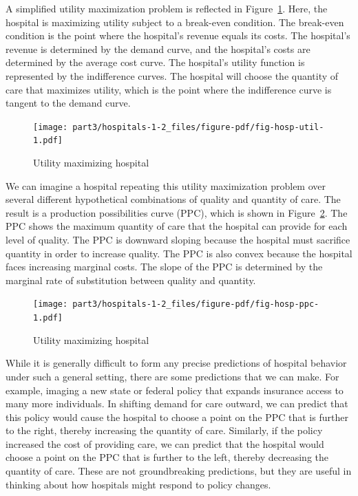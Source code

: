 \documentclass[
  letterpaper,
  DIV=11,
  numbers=noendperiod]{scrreport}
\theoremstyle{definition}
\theoremstyle{remark}
\begin{document}
A simplified utility maximization problem is reflected in
Figure~\ref{fig-hosp-util}. Here, the hospital is maximizing utility
subject to a break-even condition. The break-even condition is the point
where the hospital's revenue equals its costs. The hospital's revenue is
determined by the demand curve, and the hospital's costs are determined
by the average cost curve. The hospital's utility function is
represented by the indifference curves. The hospital will choose the
quantity of care that maximizes utility, which is the point where the
indifference curve is tangent to the demand curve.

\begin{figure}

{\centering \texttt{[image: part3/hospitals-1-2\_files/figure-pdf/fig-hosp-util-1.pdf]}

}

\caption{\label{fig-hosp-util}Utility maximizing hospital}

\end{figure}

We can imagine a hospital repeating this utility maximization problem
over several different hypothetical combinations of quality and quantity
of care. The result is a production possibilities curve (PPC), which is
shown in Figure~\ref{fig-hosp-ppc}. The PPC shows the maximum quantity
of care that the hospital can provide for each level of quality. The PPC
is downward sloping because the hospital must sacrifice quantity in
order to increase quality. The PPC is also convex because the hospital
faces increasing marginal costs. The slope of the PPC is determined by
the marginal rate of substitution between quality and quantity.

\begin{figure}

{\centering \texttt{[image: part3/hospitals-1-2\_files/figure-pdf/fig-hosp-ppc-1.pdf]}

}

\caption{\label{fig-hosp-ppc}Utility maximizing hospital}

\end{figure}

While it is generally difficult to form any precise predictions of
hospital behavior under such a general setting, there are some
predictions that we can make. For example, imaging a new state or
federal policy that expands insurance access to many more individuals.
In shifting demand for care outward, we can predict that this policy
would cause the hospital to choose a point on the PPC that is further to
the right, thereby increasing the quantity of care. Similarly, if the
policy increased the cost of providing care, we can predict that the
hospital would choose a point on the PPC that is further to the left,
thereby decreasing the quantity of care. These are not groundbreaking
predictions, but they are useful in thinking about how hospitals might
respond to policy changes.
\end{document}
